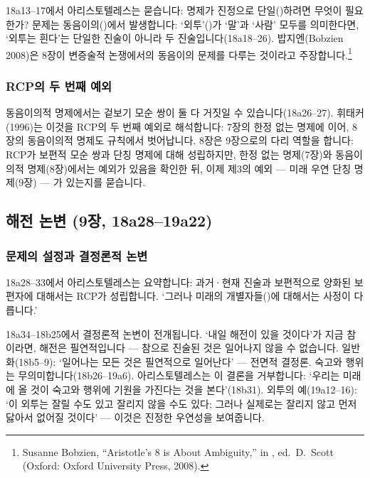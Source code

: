 \documentclass[12pt, a4paper]{article}
\begin{document}
18a13--17에서 아리스토텔레스는 묻습니다: 명제가 진정으로 단일()하려면 무엇이 필요한가? 문제는 동음이의()에서 발생합니다: `외투'()가 `말'과 `사람' 모두를 의미한다면, `외투는 흰다'는 단일한 진술이 아니라 두 진술입니다(18a18--26). 밥지엔(Bobzien 2008)은 8장이 변증술적 논쟁에서의 동음이의 문제를 다루는 것이라고 주장합니다.\footnote{Susanne Bobzien, ``Aristotle's  8 is About Ambiguity,'' in , ed.\ D.\ Scott (Oxford: Oxford University Press, 2008).}

\subsubsection{RCP의 두 번째 예외}

동음이의적 명제에서는 겉보기 모순 쌍이 둘 다 거짓일 수 있습니다(18a26--27). 휘태커(1996)는 이것을 RCP의 두 번째 예외로 해석합니다: 7장의 한정 없는 명제에 이어, 8장의 동음이의적 명제도 규칙에서 벗어납니다. 8장은 9장으로의 다리 역할을 합니다: RCP가 보편적 모순 쌍과 단칭 명제에 대해 성립하지만, 한정 없는 명제(7장)와 동음이의적 명제(8장)에서는 예외가 있음을 확인한 뒤, 이제 제3의 예외 --- 미래 우연 단칭 명제(9장) --- 가 있는지를 묻습니다.

\subsection{해전 논변 (9장, 18a28--19a22)}

\subsubsection{문제의 설정과 결정론적 논변}

18a28--33에서 아리스토텔레스는 요약합니다: 과거·현재 진술과 보편적으로 양화된 보편자에 대해서는 RCP가 성립합니다. `그러나 미래의 개별자들()에 대해서는 사정이 다릅니다.'

18a34--18b25에서 결정론적 논변이 전개됩니다. `내일 해전이 있을 것이다'가 지금 참이라면, 해전은 필연적입니다 --- 참으로 진술된 것은 일어나지 않을 수 없습니다. 일반화(18b5--9): `일어나는 모든 것은 필연적으로 일어난다' --- 전면적 결정론. 숙고와 행위는 무의미합니다(18b26--19a6). 아리스토텔레스는 이 결론을 거부합니다: `우리는 미래에 올 것이 숙고와 행위에 기원을 가진다는 것을 본다'(18b31). 외투의 예(19a12--16): `이 외투는 잘릴 수도 있고 잘리지 않을 수도 있다; 그러나 실제로는 잘리지 않고 먼저 닳아서 없어질 것이다' --- 이것은 진정한 우연성을 보여줍니다.
\end{document}
